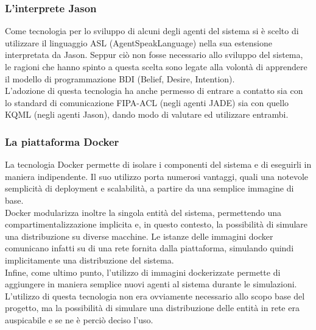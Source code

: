 
\subsubsection{L'interprete Jason}
Come tecnologia per lo sviluppo di alcuni degli agenti del sistema si è scelto di utilizzare il linguaggio ASL (AgentSpeakLanguage) nella sua estensione interpretata da Jason. Seppur ciò non fosse necessario allo sviluppo del sistema, le ragioni che hanno spinto a questa scelta sono legate alla volontà di apprendere il modello di programmazione BDI (Belief, Desire, Intention).\\
L'adozione di questa tecnologia ha anche permesso di entrare a contatto sia con lo standard di comunicazione FIPA-ACL (negli agenti JADE) sia con quello KQML (negli agenti Jason), dando modo di valutare ed utilizzare entrambi.

\subsubsection{La piattaforma Docker}
La tecnologia Docker permette di isolare i componenti del sistema e di eseguirli in maniera indipendente. Il suo utilizzo porta numerosi vantaggi, quali una notevole semplicità di deployment e scalabilità, a partire da una semplice immagine di base.\\
Docker modularizza inoltre la singola entità del sistema, permettendo una compartimentalizzazione implicita e, in questo contesto, la possibilità di simulare una distribuzione su diverse macchine. Le istanze delle immagini docker comunicano infatti su di una rete fornita dalla piattaforma, simulando quindi implicitamente una distribuzione del sistema.\\
Infine, come ultimo punto, l'utilizzo di immagini dockerizzate permette di aggiungere in maniera semplice nuovi agenti al sistema durante le simulazioni.\\
L'utilizzo di questa tecnologia non era ovviamente necessario allo scopo base del progetto, ma la possibilità di simulare una distribuzione delle entità in rete era auspicabile e se ne è perciò deciso l'uso.

